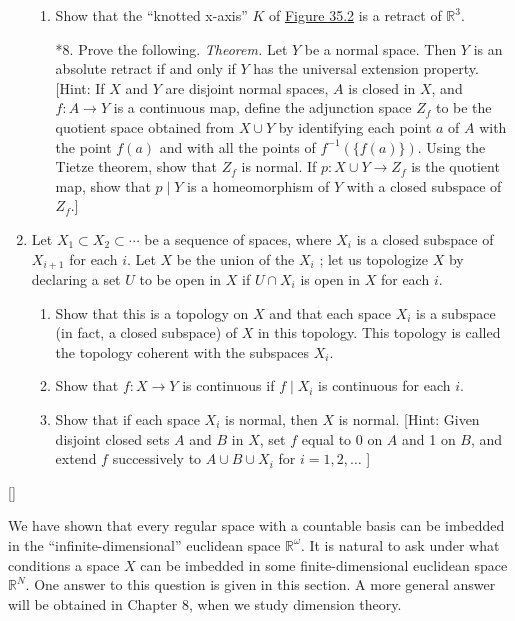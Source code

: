 \begin{enumerate}[itemsep=0.4em, parsep=0pt, topsep=0pt, partopsep=0pt, leftmargin=*, label=\arabic*., ref=\arabic*]
\begin{enumerate}[itemsep=0.2em, parsep=0pt, topsep=0pt, partopsep=0pt, leftmargin=*, label=(\alph*), align=left]
 \item Show that the ``knotted x-axis'' \(K\) of \hyperref[fig:35.2]{Figure 35.2} is a retract of \(\mathbb{R}^{3}\).
\item[*8.] Prove the following. \textsl{Theorem.} Let \(Y\) be a normal space. Then \(Y\) is an absolute retract if and only if \(Y\) has the universal extension property. [Hint: If \(X\) and \(Y\) are disjoint normal spaces, \(A\) is closed in \(X\), and \(f : A \rightarrow Y\) is a continuous map, define the adjunction space \(Z_{f}\) to be the quotient space obtained from \(X \cup Y\) by identifying each point \(a\) of \(A\) with the point \(f( a)\) and with all the points of \(f^{-1}( {\{ f( a) \} })\). Using the Tietze theorem, show that \(Z_{f}\) is normal. If \(p : X \cup Y \rightarrow {Z}_{f}\) is the quotient map, show that \(p \mid Y\) is a homeomorphism of \(Y\) with a closed subspace of \(Z_{f}\).]
 \end{enumerate}
\addtocounter{enumi}{1}%
\item Let \(X_{1} \subset {X}_{2} \subset \cdots\) be a sequence of spaces, where \(X_{i}\) is a closed subspace of \(X_{i + 1}\) for each \(i\). Let \(X\) be the union of the \(X_{i}\) ; let us topologize \(X\) by declaring a set \(U\) to be open in \(X\) if \(U \cap {X}_{i}\) is open in \(X\) for each \(i\).
 \begin{enumerate}[itemsep=0.2em, parsep=0pt, topsep=0pt, partopsep=0pt, leftmargin=*, label=(\alph*), align=left]
 \item Show that this is a topology on \(X\) and that each space \(X_{i}\) is a subspace (in fact, a closed subspace) of \(X\) in this topology. This topology is called the topology coherent with the subspaces \(X_{i}\).
 \item Show that \(f : X \rightarrow Y\) is continuous if \(f \mid {X}_{i}\) is continuous for each \(i\).
 \item Show that if each space \(X_{i}\) is normal, then \(X\) is normal. [Hint: Given disjoint closed sets \(A\) and \(B\) in \(X\), set \(f\) equal to 0 on \(A\) and 1 on \(B\), and extend \(f\) successively to \(A \cup B \cup {X}_{i}\) for \(i = 1,2,\ldots\) ] 
 \end{enumerate}
\end{enumerate}
[\protect\sectionDagger]

We have shown that every regular space with a countable basis can be imbedded in the ``infinite-dimensional'' euclidean space \(\mathbb{R}^{\omega }\). It is natural to ask under what conditions a space \(X\) can be imbedded in some finite-dimensional euclidean space \(\mathbb{R}^{N}\). One answer to this question is given in this section. A more general answer will be obtained in Chapter 8, when we study dimension theory.

